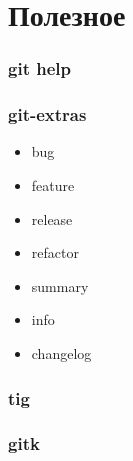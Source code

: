 \documentclass[bigger]{beamer}
\begin{document}
\section{Полезное}
\label{sec-6}
\begin{frame}
\frametitle{git help}
\label{sec-6-1}
\end{frame}
\begin{frame}
\frametitle{git-extras}
\label{sec-6-2}
\begin{itemize}

\item bug
\label{sec-6-2-1}%

\item feature
\label{sec-6-2-2}%

\item release
\label{sec-6-2-3}%

\item refactor
\label{sec-6-2-4}%

\item summary
\label{sec-6-2-5}%

\item info
\label{sec-6-2-6}%

\item changelog
\label{sec-6-2-7}%
\end{itemize} %
\end{frame}
\begin{frame}
\frametitle{tig}
\label{sec-6-3}
\end{frame}
\begin{frame}
\frametitle{gitk}
\label{sec-6-4}
\end{frame}
\end{document}
